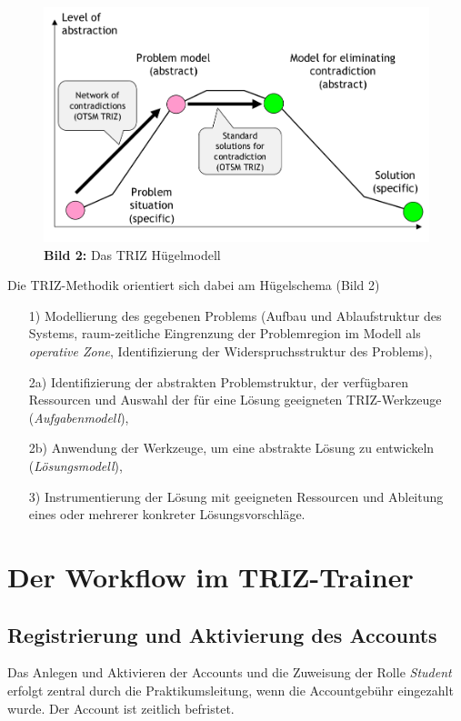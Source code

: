 \documentclass[11pt,a4paper]{article}
\begin{document}
\begin{figure}[ht]\centering
    \includegraphics[width=.8\textwidth]{HillModel.png}\\
    \textbf{Bild 2:} Das TRIZ Hügelmodell
\end{figure}
Die TRIZ-Methodik orientiert sich dabei am Hügelschema (Bild 2)
\begin{itemize}
\item [1)] Modellierung des gegebenen Problems (Aufbau und Ablaufstruktur des
  Systems, raum-zeitliche Eingrenzung der Problemregion im Modell als
  \emph{operative Zone}, Identifizierung der Widerspruchsstruktur des
  Problems), 
\item [2a)] Identifizierung der abstrakten Problemstruktur, der verfügbaren
  Ressourcen und Auswahl der für eine Lösung geeigneten TRIZ-Werkzeuge
  (\emph{Aufgabenmodell}),
\item [2b)] Anwendung der Werkzeuge, um eine abstrakte Lösung zu entwickeln
  (\emph{Lösungsmodell}),
\item [3)] Instrumentierung der Lösung mit geeigneten Ressourcen und Ableitung
  eines oder mehrerer konkreter Lösungsvorschläge.
\end{itemize}

\section{Der Workflow im TRIZ-Trainer}

\subsection{Registrierung und Aktivierung des Accounts}

Das Anlegen und Aktivieren der Accounts und die Zuweisung der Rolle
\emph{Student} erfolgt zentral durch die Praktikumsleitung, wenn die
Accountgebühr eingezahlt wurde.  Der Account ist zeitlich befristet.
\end{document}
